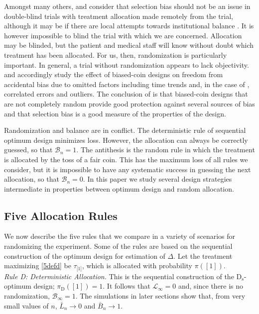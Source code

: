 \documentclass[number,12pt,review]{elsarticle}
\begin{document}
Amongst many others, \citet{efr:71} and \citet{rls:84b} consider that selection bias should not be an issue in double-blind trials with treatment allocation made remotely from the trial, although it may be if there are local attempts towards institutional balance \citep{lagakos+:1984}. It is however impossible to blind the trial with which we are concerned. Allocation may be blinded, but the patient and medical staff will know without doubt which treatment has been allocated. For us, then, randomization is particularly important. In general, a trial without randomization appears to lack objectivity. \citet{efr:71} and \citet{rls:84b} accordingly  study the effect of biased-coin designs on freedom from accidental bias due to omitted factors including time trends and, in the case of \citet{rls:84b}, correlated errors and outliers. The conclusion of \citet{rls:84b} is that biased-coin designs that are not completely random provide good protection against several sources of bias and that selection bias is a good measure of the properties of the design.

Randomization and balance are in conflict. The deterministic rule of sequential optimum design minimizes loss. However, the allocation can always be correctly guessed, so that $\mathcal{B}_n = 1$. The antithesis is the random rule in which the treatment is allocated by the toss of a fair coin. This has the maximum loss of all rules we consider, but it is impossible to have any systematic success in guessing the next allocation, so that $\mathcal{B}_n = 0.$  In this paper we study several design strategies intermediate in properties between optimum design and random allocation.

\subsection{Five Allocation Rules}

\label{FiveruleSec}

We now describe the five rules that we compare in a variety of scenarios for randomizing the experiment. Some  of the rules are based on the sequential construction of the optimum design for estimation of $\Delta$.  Let the treatment maximizing \eqref{5defd} be $\tau_{\text{[1]}}$, which is allocated with probability $\pi([1]).$\\

{\it Rule D: Deterministic Allocation.} This is the sequential construction of the D$_{\text{s}}$-optimum design; $\pi_{\text{D}}([1]) = 1 $.
It follows that $\mathcal{L}_{\infty} =0$ and, since there is no randomization, $\mathcal{B}_{\infty} =1$. The simulations in later sections show that, from very small values of $n$, $\bar{L}_n \to 0$ and $\bar{B}_n \to 1$. \\
\end{document}
